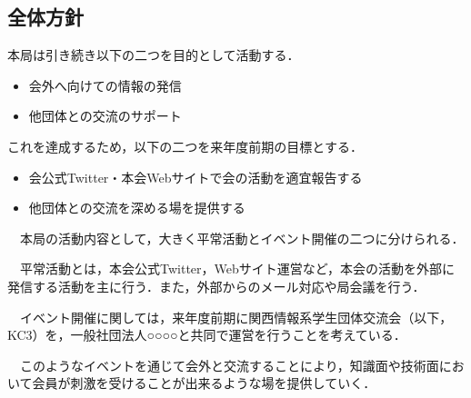 \subsection*{全体方針}


本局は引き続き以下の二つを目的として活動する．
\begin{itemize}
    \item 会外へ向けての情報の発信
    \item 他団体との交流のサポート
\end{itemize}
これを達成するため，以下の二つを来年度前期の目標とする．
\begin{itemize}
    \item 会公式Twitter・本会Webサイトで会の活動を適宜報告する
    \item 他団体との交流を深める場を提供する
\end{itemize}
　本局の活動内容として，大きく平常活動とイベント開催の二つに分けられる．

　平常活動とは，本会公式Twitter，Webサイト運営など，本会の活動を外部に発信する活動を主に行う．また，外部からのメール対応や局会議を行う．

　イベント開催に関しては，来年度前期に関西情報系学生団体交流会（以下，KC3）を，一般社団法人○○○○と共同で運営を行うことを考えている．

　このようなイベントを通じて会外と交流することにより，知識面や技術面において会員が刺激を受けることが出来るような場を提供していく．

